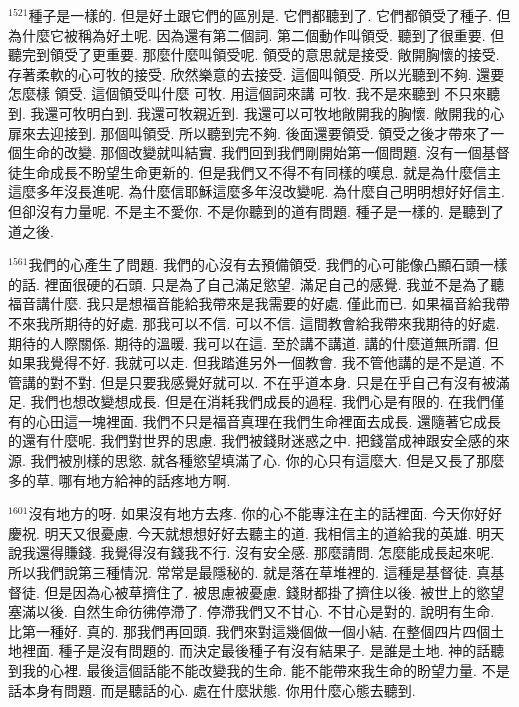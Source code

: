\documentclass{book}
\begin{document}
$^{1521}$種子是一樣的.
但是好土跟它們的區別是.
它們都聽到了.
它們都領受了種子.
但為什麼它被稱為好土呢.
因為還有第二個詞.
第二個動作叫領受.
聽到了很重要.
但聽完到領受了更重要.
那麼什麼叫領受呢.
領受的意思就是接受.
敞開胸懷的接受.
存著柔軟的心可牧的接受.
欣然樂意的去接受.
這個叫領受.
所以光聽到不夠.
還要怎麼樣 領受.
這個領受叫什麼 可牧.
用這個詞來講 可牧.
我不是來聽到 不只來聽到.
我還可牧明白到.
我還可牧親近到.
我還可以可牧地敞開我的胸懷.
敞開我的心扉來去迎接到.
那個叫領受.
所以聽到完不夠.
後面還要領受.
領受之後才帶來了一個生命的改變.
那個改變就叫結實.
我們回到我們剛開始第一個問題.
沒有一個基督徒生命成長不盼望生命更新的.
但是我們又不得不有同樣的嘆息.
就是為什麼信主這麼多年沒長進呢.
為什麼信耶穌這麼多年沒改變呢.
為什麼自己明明想好好信主.
但卻沒有力量呢.
不是主不愛你.
不是你聽到的道有問題.
種子是一樣的.
是聽到了道之後.

$^{1561}$我們的心產生了問題.
我們的心沒有去預備領受.
我們的心可能像凸顯石頭一樣的話.
裡面很硬的石頭.
只是為了自己滿足慾望.
滿足自己的感覺.
我並不是為了聽福音講什麼.
我只是想福音能給我帶來是我需要的好處.
僅此而已.
如果福音給我帶不來我所期待的好處.
那我可以不信.
可以不信.
這間教會給我帶來我期待的好處.
期待的人際關係.
期待的溫暖.
我可以在這.
至於講不講道.
講的什麼道無所謂.
但如果我覺得不好.
我就可以走.
但我踏進另外一個教會.
我不管他講的是不是道.
不管講的對不對.
但是只要我感覺好就可以.
不在乎道本身.
只是在乎自己有沒有被滿足.
我們也想改變想成長.
但是在消耗我們成長的過程.
我們心是有限的.
在我們僅有的心田這一塊裡面.
我們不只是福音真理在我們生命裡面去成長.
還隨著它成長的還有什麼呢.
我們對世界的思慮.
我們被錢財迷惑之中.
把錢當成神跟安全感的來源.
我們被別樣的思慾.
就各種慾望填滿了心.
你的心只有這麼大.
但是又長了那麼多的草.
哪有地方給神的話疼地方啊.

$^{1601}$沒有地方的呀.
如果沒有地方去疼.
你的心不能專注在主的話裡面.
今天你好好慶祝.
明天又很憂慮.
今天就想想好好去聽主的道.
我相信主的道給我的英雄.
明天說我還得賺錢.
我覺得沒有錢我不行.
沒有安全感.
那麼請問.
怎麼能成長起來呢.
所以我們說第三種情況.
常常是最隱秘的.
就是落在草堆裡的.
這種是基督徒.
真基督徒.
但是因為心被草擠住了.
被思慮被憂慮.
錢財都掛了擠住以後.
被世上的慾望塞滿以後.
自然生命彷彿停滯了.
停滯我們又不甘心.
不甘心是對的.
說明有生命.
比第一種好.
真的.
那我們再回頭.
我們來對這幾個做一個小結.
在整個四片四個土地裡面.
種子是沒有問題的.
而決定最後種子有沒有結果子.
是誰是土地.
神的話聽到我的心裡.
最後這個話能不能改變我的生命.
能不能帶來我生命的盼望力量.
不是話本身有問題.
而是聽話的心.
處在什麼狀態.
你用什麼心態去聽到.
\end{document}
